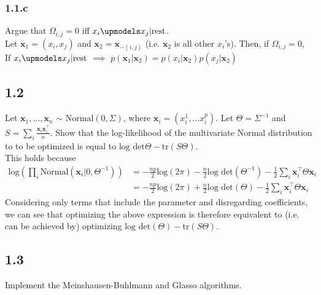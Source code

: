 \documentclass[12pt]{article}
\begin{document}
\subsubsection*{1.1.c}
Argue that $\Omega_{i,j}=0$ iff $x_i \upmodels x_j | \text{rest}$.\\

Let $\textbf{x}_1 = (x_i,x_j)$ and $\textbf{x}_2 = \textbf{x}_{-(i,j)}$ (i.e. $\textbf{x}_2$ is all other $x_i$'s). Then, if $\Omega_{i,j} = 0$, 
\\

If $x_i \upmodels x_j | \text{rest}$ $\implies$ $p(\textbf{x}_1 | \textbf{x}_2) = p(x_i | \textbf{x}_2) p(x_j | \textbf{x}_2)$


\subsection*{1.2}
Let $\textbf{x}_1, \ldots, \textbf{x}_n$ $\sim$ $\text{Normal}(0,\Sigma)$, where $\textbf{x}_i = (x_i^1, \ldots x_i^p)$. Let $\Theta = \Sigma^{-1}$ and $S = \sum_i \frac{\textbf{x}_i \textbf{x}_i^\top}{n}$. Show that the log-likelihood of the multivariate Normal distribution to to be optimized is equal to $\text{log} \text{ det} \Theta - \text{tr}(S\Theta)$.\\

This holds because 
\begin{equation}
    \begin{split}
        \text{log} \left( \prod_i \text{Normal}(\textbf{x}_i | 0,\Theta^{-1}) \right) 
        &= -\frac{np}{2}\text{log}(2\pi) - \frac{n}{2} \text{log} \text{ det}(\Theta^{-1}) - \frac{1}{2} \sum_i \textbf{x}_i^{\top} \Theta \textbf{x}_i\\
        &= -\frac{np}{2}\text{log}(2\pi) + \frac{n}{2} \text{log} \text{ det}(\Theta) - \frac{1}{2} \sum_i \textbf{x}_i^{\top} \Theta \textbf{x}_i
    \end{split}
\end{equation}
Considering only terms that include the parameter and disregarding coefficients, we can see that optimizing the above expression is therefore equivalent to (i.e. can be achieved by) optimizing $\text{log} \text{ det}(\Theta) - \text{tr}(S\Theta)$.


\subsection*{1.3}
Implement the Meinshausen-Buhlmann and Glasso algorithms.\\
\end{document}
